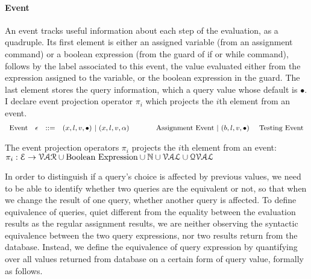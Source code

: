 \paragraph{Event}
An event tracks useful information about each step of the evaluation, as a quadruple. Its first element is either 
an assigned variable (from an assignment command) or a boolean expression (from the guard of if or while command), follows by 
 the label associated to this event, the value evaluated either from the expression assigned to the variable,
or the boolean expression in the guard.
 The last element stores the query information, which a query value whose default is $\bullet$. I declare event projection operator $\pi_i$ which projects the $i$th element from an event.
\[
\begin{array}{llll}
\mbox{Event} 
& \mathtt{\epsilon} & ::= & 
    ({x}, l, v, \bullet) ~|~ ({x}, l, v, \alpha)  ~~~~~~~~~~~ \mbox{Assignment Event} 
~|~(b, l, v, \bullet)   
~~~~
\mbox{Testing Event}
\end{array}
\]

The event projection operators $\pi_i$ projects the $i$th element from an event: 
\\
$\pi_i : 
\mathcal{E} \to \mathcal{VAR}\cup \mbox{Boolean Expression}  \cup \mathbb{N} \cup \mathcal{VAL} \cup \mathcal{QVAL} $ 

%
In order to distinguish if a query's choice is affected by previous values, 
we need to be able to identify whether two queries are the equivalent or not, so that when we change the result of one query, 
whether another query is affected. 
To define equivalence of queries,
quiet different from the equality between the evaluation results as the regular assignment results, 
we are neither observing the syntactic equivalence between the two query expressions,
nor two results return from the database. 
Instead, we define the equivalence of query expression by quantifying over all values returned from database on a certain form of query value, formally as follows.


